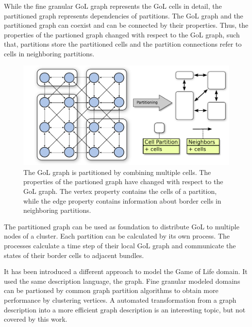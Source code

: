While the fine granular GoL graph represents the GoL cells in detail,
the partitioned graph represents dependencies of partitions. The GoL
graph and the partitioned graph can coexist and can be connected by their
properties. Thus, the properties of the partioned graph changed with
respect to the GoL graph, such that, partitions store the partitioned cells and
the partition connections refer to cells in neighboring partitions.

\begin{figure}[H]
  \centering \includegraphics[width=\textwidth]{graphics/30_gol_bundle}
  \caption{The GoL graph is partitioned by combining multiple
    cells. The properties of the partioned graph have changed with
    respect to the GoL graph. The vertex property contains the cells
    of a partition, while the edge property contains information about
    border cells in neighboring partitions.}
  \label{fig:gol_bundle}
\end{figure}

\noindent The partitioned graph can be used as foundation to distribute GoL to
multiple nodes of a cluster. Each partition can be calculated by its own
process. The processes calculate a time step of their local GoL graph and
communicate the states of their border cells to adjacent bundles.

It has been introduced a different approach to model the Game of Life
domain. It used the same description language, the graph.  Fine
granular modeled domains can be partioned by common graph partition
algorithms to obtain more performance by clustering
vertices. A automated transformation from a graph description into a
more efficient graph description is an interesting topic, but not
covered by this work.


